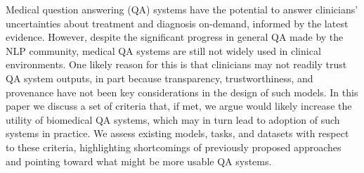 Medical question answering (QA) systems have the potential to answer clinicians' uncertainties about treatment and diagnosis on-demand, informed by the latest evidence.    However, despite the significant progress in general QA made by the NLP community, medical QA systems are still not widely used in clinical environments.  One likely reason for this is that clinicians may not readily trust QA system outputs, in part because transparency,  trustworthiness, and provenance have not been key considerations in the design of such models.  In this paper we discuss a set of criteria that, if met, we argue would likely increase the utility of biomedical QA systems, which may in turn lead to adoption of such systems in practice.  We assess existing models, tasks, and datasets with respect to these criteria, highlighting shortcomings of previously proposed approaches and pointing toward what might be more usable QA systems.
